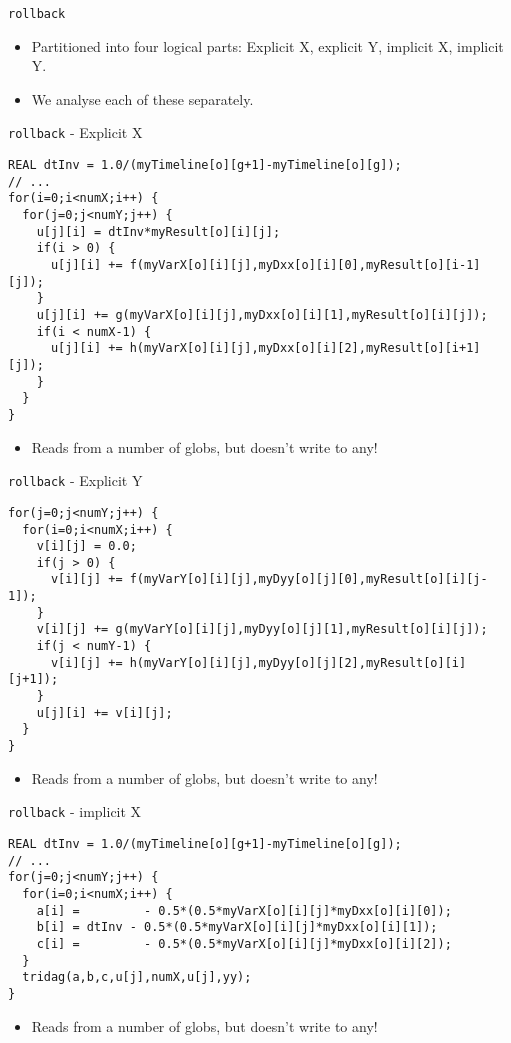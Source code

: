 \documentclass{beamer}
\begin{document}
\begin{frame}{\texttt{rollback}}
\begin{itemize}
    \item Partitioned into four logical parts: Explicit X, explicit Y, implicit X, implicit Y.
    \item We analyse each of these separately.
\end{itemize}
\end{frame}

\begin{frame}[fragile]{\texttt{rollback} - Explicit X}
\begin{lstlisting}[basicstyle=\tiny\ttfamily]
REAL dtInv = 1.0/(myTimeline[o][g+1]-myTimeline[o][g]);
// ...
for(i=0;i<numX;i++) {
  for(j=0;j<numY;j++) {
    u[j][i] = dtInv*myResult[o][i][j];
    if(i > 0) {
      u[j][i] += f(myVarX[o][i][j],myDxx[o][i][0],myResult[o][i-1][j]);
    }
    u[j][i] += g(myVarX[o][i][j],myDxx[o][i][1],myResult[o][i][j]);
    if(i < numX-1) {
      u[j][i] += h(myVarX[o][i][j],myDxx[o][i][2],myResult[o][i+1][j]);
    }
  }
}
\end{lstlisting}
\begin{itemize}
    \item Reads from a number of globs, but doesn't write to any!
\end{itemize}
\end{frame}

\begin{frame}[fragile]{\texttt{rollback} - Explicit Y}
\begin{lstlisting}[basicstyle=\tiny\ttfamily]
for(j=0;j<numY;j++) {
  for(i=0;i<numX;i++) {
    v[i][j] = 0.0;
    if(j > 0) {
      v[i][j] += f(myVarY[o][i][j],myDyy[o][j][0],myResult[o][i][j-1]);
    }
    v[i][j] += g(myVarY[o][i][j],myDyy[o][j][1],myResult[o][i][j]);
    if(j < numY-1) {
      v[i][j] += h(myVarY[o][i][j],myDyy[o][j][2],myResult[o][i][j+1]);
    }
    u[j][i] += v[i][j];
  }
}
\end{lstlisting}
\begin{itemize}
    \item Reads from a number of globs, but doesn't write to any!
\end{itemize}
\end{frame}

\begin{frame}[fragile]{\texttt{rollback} - implicit X}
\begin{lstlisting}[basicstyle=\tiny\ttfamily]
REAL dtInv = 1.0/(myTimeline[o][g+1]-myTimeline[o][g]);
// ...
for(j=0;j<numY;j++) {
  for(i=0;i<numX;i++) {
    a[i] =         - 0.5*(0.5*myVarX[o][i][j]*myDxx[o][i][0]);
    b[i] = dtInv - 0.5*(0.5*myVarX[o][i][j]*myDxx[o][i][1]);
    c[i] =         - 0.5*(0.5*myVarX[o][i][j]*myDxx[o][i][2]);
  }
  tridag(a,b,c,u[j],numX,u[j],yy);
}
\end{lstlisting}
\begin{itemize}
    \item Reads from a number of globs, but doesn't write to any!
\end{itemize}
\end{frame}
\end{document}
